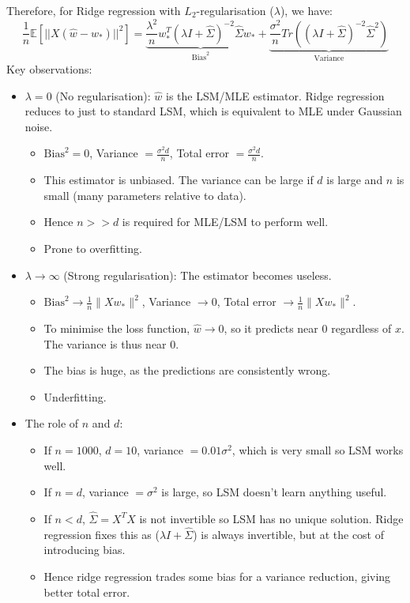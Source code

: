 \documentclass[../Probability.tex]{subfiles}
\begin{document}
\noindent Therefore, for Ridge regression with $L_2$-regularisation ($\lambda$), we have:
$$\frac{1}{n} \mathbb{E}[||X(\hat{w} - w_*)||^2] = \underbrace{\frac{\lambda^2}{n} w_*^T (\lambda I + \hat{\Sigma})^{-2} \hat{\Sigma} w_*}_{\text{Bias}^2} + \underbrace{\frac{\sigma^2}{n} Tr((\lambda I + \hat{\Sigma})^{-2} \hat{\Sigma}^2)}_{\text{Variance}}$$
Key observations:
\begin{itemize}
    \item $\lambda=0$ (No regularisation): $\hat{w}$ is the LSM/MLE estimator. Ridge regression reduces to just to standard LSM, which is equivalent to MLE under Gaussian noise.
    \begin{itemize}
        \item $\text{Bias}^2 = 0$, Variance $= \frac{\sigma^2 d}{n}$, Total error $= \frac{\sigma^2 d}{n}$.
        \item This estimator is unbiased. The variance can be large if $d$ is large and $n$ is small (many parameters relative to data).
        \item Hence $n>>d$ is required for MLE/LSM to perform well.
        \item Prone to overfitting.
    \end{itemize}
    \item $\lambda\to\infty$ (Strong regularisation): The estimator becomes useless.
    \begin{itemize}
        \item $\text{Bias}^2 \to \frac{1}{n}\|Xw_*\|^2$, Variance $\to 0$, Total error $\to \frac{1}{n}\|Xw_*\|^2$.
        \item To minimise the loss function, $\hat{w}\to 0$, so it predicts near 0 regardless of $x$. The variance is thus near 0.
        \item The bias is huge, as the predictions are consistently wrong.
        \item Underfitting.
    \end{itemize}
    \item The role of $n$ and $d$:
    \begin{itemize}
        \item If $n=1000$, $d=10$, variance $= 0.01\sigma^2$, which is very small so LSM works well.
        \item If $n=d$, variance $=\sigma^2$ is large, so LSM doesn't learn anything useful.
        \item If $n<d$, $\hat{\Sigma}=X^TX$ is not invertible so LSM has no unique solution. Ridge regression fixes this as ($\lambda I + \hat{\Sigma}$) is always invertible, but at the cost of introducing bias.
        \item Hence ridge regression trades some bias for a variance reduction, giving better total error.
    \end{itemize}
\end{itemize}
\end{document}
